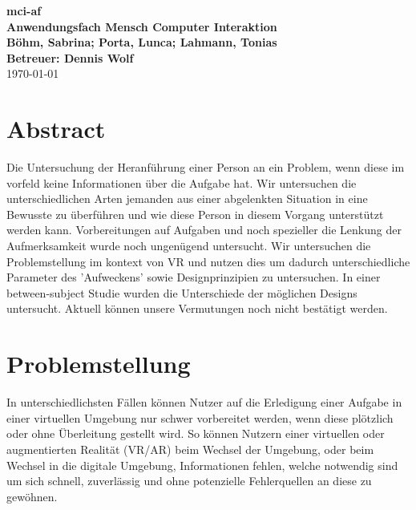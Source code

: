 \documentclass[a4paper, 11pt]{article}
\newcommand{\projectName}{mci-af}
\begin{document}
\begin{center}
	\textbf{\LARGE{\projectName}}\\
    \textbf{\large{Anwendungsfach Mensch Computer Interaktion}}\\
	\vspace{7mm}
    \textbf{\large{Böhm, Sabrina; Porta, Lunca; Lahmann, Tonias}}\\
	\textbf{\large{Betreuer: Dennis Wolf}}\\
	\today
\end{center}

\section*{Abstract}
Die Untersuchung der Heranführung einer Person an ein Problem, wenn diese im vorfeld keine Informationen über die Aufgabe hat. %
Wir untersuchen die unterschiedlichen Arten jemanden aus einer abgelenkten Situation in eine Bewusste zu überführen und wie diese Person in diesem Vorgang unterstützt werden kann. %
Vorbereitungen auf Aufgaben und noch spezieller die Lenkung der Aufmerksamkeit wurde noch ungenügend untersucht. %
Wir untersuchen die Problemstellung im kontext von VR und nutzen dies um dadurch unterschiedliche Parameter des 'Aufweckens' sowie Designprinzipien zu untersuchen. %
In einer between-subject Studie wurden die Unterschiede der möglichen Designs untersucht. %
Aktuell können unsere Vermutungen noch nicht bestätigt werden. %

\section*{Problemstellung}
In unterschiedlichsten Fällen können Nutzer auf die Erledigung einer Aufgabe in einer virtuellen Umgebung nur schwer vorbereitet werden, wenn diese  plötzlich oder ohne Überleitung gestellt wird. So können Nutzern einer virtuellen oder augmentierten Realität (VR/AR) beim Wechsel der Umgebung, oder beim Wechsel in die digitale Umgebung, Informationen fehlen, welche notwendig sind um sich schnell, zuverlässig und ohne potenzielle Fehlerquellen an diese zu gewöhnen. 
\end{document}
